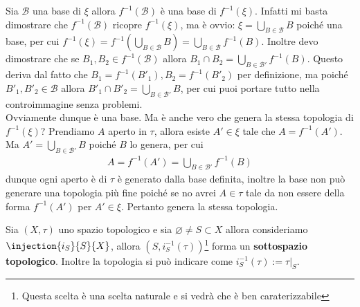 \begin{remark}
	\label{remark:induced_bases_by_a_map}
	Sia $\mathcal{B}$ una base di $\xi$ allora $f^{-1}(\mathcal{B})$ è una base di $f^{-1}(\xi)$. Infatti mi basta dimostrare che $f^{-1}(\mathcal{B})$ ricopre $f^{-1}(\xi)$, ma è ovvio: $\xi = \bigcup_{B \in \mathcal{B}} B$ poiché una base, per cui $f^{-1}(\xi) = f^{-1}(\bigcup_{B \in \mathcal{B}} B) = \bigcup_{B \in \mathcal{B}} f^{-1}(B)$. Inoltre devo dimostrare che se $B_1, B_2 \in f^{-1}(\mathcal{B})$ allora $B_1 \cap B_2 = \bigcup_{B \in \mathcal{B}'}f^{-1}(B)$. Questo deriva dal fatto che $B_1 = f^{-1}(B'_1), B_2 = f^{-1}(B'_2)$ per definizione, ma poiché $B'_1, B'_2 \in \mathcal{B}$ allora $B'_1 \cap B'_2 = \bigcup_{B \in \mathcal{B}'} B$, per cui puoi portare tutto nella controimmagine senza problemi. \\
	
	Ovviamente dunque è una base. Ma è anche vero che genera la stessa topologia di $f^{-1}(\xi)$? Prendiamo $A$ aperto in $\tau$, allora esiste $A' \in \xi$ tale che $A = f^{-1}(A')$. Ma $A' = \bigcup_{B \in \mathcal{B}'} B$ poiché $B$ lo genera, per cui
	\begin{equation}
	\begin{aligned}
		A = f^{-1}(A') = \bigcup_{B \in \mathcal{B}'} f^{-1}(B) 
	\end{aligned}
	\end{equation}
	dunque ogni aperto è di $\tau$ è generato dalla base definita, inoltre la base non può generare una topologia più fine poiché se no avrei $A \in \tau$ tale da non essere della forma $f^{-1}(A')$ per $A' \in \xi$. Pertanto genera la stessa topologia.
\end{remark}

\begin{definition}
	Sia $(X,\tau)$ uno spazio topologico e sia $\varnothing \neq S \subset X$ allora consideriamo $\injection{i_S}{S}{X}$, allora $(S, i^{-1}_S(\tau))$\footnote{Questa scelta è una scelta naturale e si vedrà che è ben caraterizzabile} forma un \textbf{sottospazio topologico}. Inoltre la topologia si può indicare come $i^{-1}_S(\tau) := \tau|_S$. 
\end{definition}

